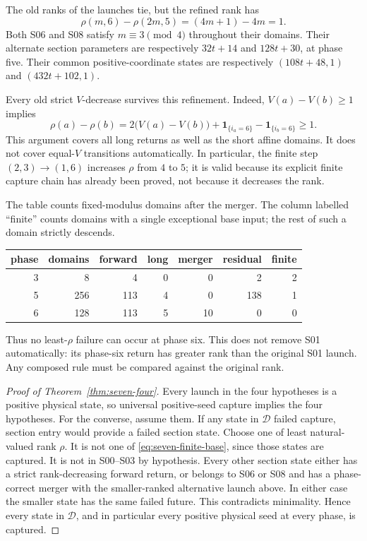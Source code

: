 The old ranks of the launches tie, but the refined rank has
\begin{equation}
 \rho(m,6)-\rho(2m,5)=(4m+1)-4m=1.
 \label{eq:seven-merger-gap}
\end{equation}
Both S06 and S08 satisfy $m\equiv3\pmod4$ throughout their domains.
Their alternate section parameters are respectively $32t+14$ and
$128t+30$, at phase five.  Their common positive-coordinate states
are respectively $(108t+48,1)$ and $(432t+102,1)$.

Every old strict $V$-decrease survives this refinement.  Indeed,
$V(a)-V(b)\ge1$ implies
\[
 \rho(a)-\rho(b)
 =2\bigl(V(a)-V(b)\bigr)+\mathbf1_{\{i_a=6\}}
                         -\mathbf1_{\{i_b=6\}}\ge1.
\]
This argument covers all long returns as well as the short affine
domains.  It does not cover equal-$V$ transitions automatically.  In
particular, the finite step $(2,3)\to(1,6)$ increases $\rho$ from
$4$ to $5$; it is valid because its explicit finite capture chain
has already been proved, not because it decreases the rank.

The table counts fixed-modulus domains after the merger. The column labelled ``finite'' counts
domains with a single exceptional base input; the rest of such a
domain strictly descends.
\begin{center}
\begin{tabular}{rrrrrrr}
\hline
phase&domains&forward&long&merger&residual&finite\\ \hline
3&8&4&0&0&2&2\\
5&256&113&4&0&138&1\\
6&128&113&5&10&0&0\\ \hline
\end{tabular}
\end{center}
Thus no least-$\rho$ failure can occur at phase six.  This does not
remove S01 automatically: its phase-six return has greater rank
than the original S01 launch.  Any composed rule must be compared
against the original rank.

\begin{proof}[Proof of Theorem~\ref{thm:seven-four}]
Every launch in the four hypotheses is a positive physical state,
so universal positive-seed capture implies the four hypotheses.
For the converse, assume them.  If any state in $\mathcal D$ failed
capture, section entry would provide a failed section state.  Choose
one of least natural-valued rank $\rho$.  It is not one of
\eqref{eq:seven-finite-base}, since those states are captured.
It is not in S00--S03 by hypothesis.  Every other section state
either has a strict rank-decreasing forward return, or belongs to
S06 or S08 and has a phase-correct merger with the smaller-ranked
alternative launch above.  In either case the smaller state has
the same failed future.  This contradicts minimality.  Hence every
state in $\mathcal D$, and in particular every positive physical
seed at every phase, is captured.
\end{proof}

